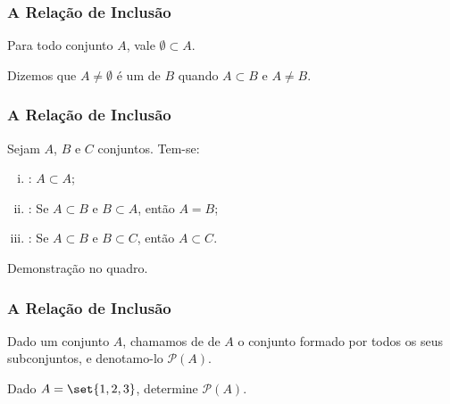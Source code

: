 
\begin{frame}
\frametitle{A Relação de Inclusão} %

\begin{Prop}
Para todo conjunto $A$, vale $\emptyset \subset A$.
\end{Prop}

\begin{Def}
Dizemos que $A \neq \emptyset$ é um  de $B$
quando $A \subset B$  e $A \neq B$.
\end{Def}



\end{frame}



\begin{frame}
\frametitle{A Relação de Inclusão} %
\begin{Prop}
Sejam $A$, $B$ e $C$ conjuntos. Tem-se:
\begin{enumerate}[i.]
	\item {}: $A \subset A$;
	\item {}: Se $A \subset B$ e $B \subset A$,
	então $A = B$;
	\item {}: Se $A \subset B$ e $B \subset C$,
	então $A \subset C$.
\end{enumerate}
\end{Prop}

Demonstração no quadro.


\end{frame}


\begin{frame}
\frametitle{A Relação de Inclusão} %

\begin{Def}
Dado um conjunto $A$, chamamos de  de $A$ o conjunto formado por todos
os seus subconjuntos, e denotamo-lo $\mathcal{P}(A)$.
\end{Def}

\begin{Exem}
Dado $A = \set {1, 2, 3}$, determine $\mathcal{P}(A)$.
\end{Exem}



\end{frame}